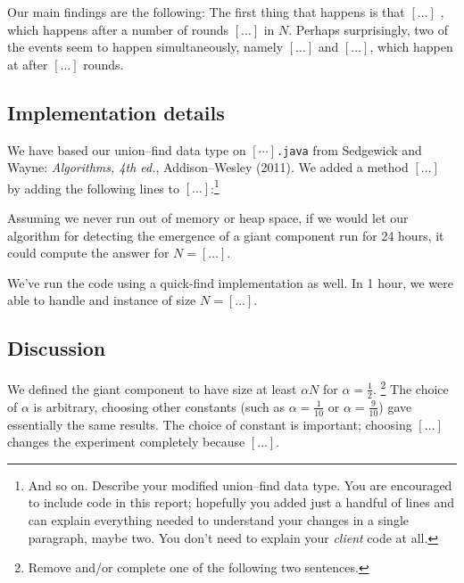 \documentclass{tufte-handout}
\begin{document}
\medskip\noindent
Our main findings are the following:
The first thing that happens is that $[\ldots]$ , which happens after a number of rounds $[\ldots]$  in $N$.
Perhaps surprisingly, two of the events seem to happen simultaneously, namely $[\ldots]$ and $[\ldots]$, which happen at after $[\ldots]$ rounds.


\subsection{Implementation details}

We have based our union--find data type on $[\cdots]${\tt .java} from Sedgewick and Wayne: {\em Algorithms, 4th ed.}, Addison--Wesley (2011).
We added a method $[\ldots]$ by adding the following lines to $[\dots]$:\footnote{And so on. Describe your modified union--find data type.
You are encouraged to include code in this report; hopefully you added just a handful of lines and can explain everything needed to understand your changes in a single paragraph, maybe two. 
You don't need to explain your \emph{client} code at all.}

Assuming we never run out of memory or heap space, if we would let our algorithm for detecting the emergence of a giant component run for 24 hours, it could compute the answer for $N= [\ldots]$.

We've run the code using a quick-find implementation as well.
In 1 hour, we were able to handle and instance of size $N=[\ldots]$.



\subsection{Discussion}

We defined the giant component to have size at least $\alpha N$ for $\alpha = \frac{1}{2}$. \footnote{Remove and/or complete one of the following two sentences.}
The choice of $\alpha$ is arbitrary, choosing other constants (such as $\alpha=\frac{1}{10}$ or $\alpha=\frac{9}{10}$) gave essentially the same results.
The choice of constant is important; choosing $[\ldots]$ changes the experiment completely because $[\ldots]$.
\end{document}
